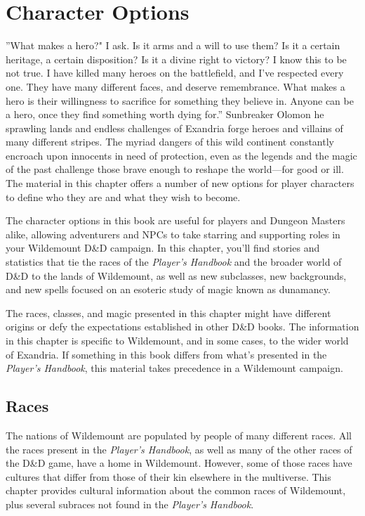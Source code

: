 \documentclass[10pt,a4paper,twoside,bg=print,twocolumn,openany,nodeprecatedcode]{dndbook}
\begin{document}
\chapter{Character Options}
\DndQuote%
{}
{''What makes a hero?" I ask. Is it arms and a will to use them? Is it a certain heritage, a certain disposition? Is it a divine right to victory? I know this to be not true. I have killed many heroes on the battlefield, and I've respected every one. They have many different faces, and deserve remembrance. What makes a hero is their willingness to sacrifice for something they believe in. Anyone can be a hero, once they find something worth dying for.''}
{Sunbreaker Olomon}
he sprawling lands and endless challenges of Exandria forge heroes and villains of many different stripes. The myriad dangers of this wild continent constantly encroach upon innocents in need of protection, even as the legends and the magic of the past challenge those brave enough to reshape the world—for good or ill. The material in this chapter offers a number of new options for player characters to define who they are and what they wish to become.


The character options in this book are useful for players and Dungeon Masters alike, allowing adventurers and NPCs to take starring and supporting roles in your Wildemount D\&D campaign. In this chapter, you'll find stories and statistics that tie the races of the \textit{Player's Handbook} and the broader world of D\&D to the lands of Wildemount, as well as new subclasses, new backgrounds, and new spells focused on an esoteric study of magic known as dunamancy.

The races, classes, and magic presented in this chapter might have different origins or defy the expectations established in other D\&D books. The information in this chapter is specific to Wildemount, and in some cases, to the wider world of Exandria. If something in this book differs from what's presented in the \textit{Player's Handbook}, this material takes precedence in a Wildemount campaign.

\section{Races}
The nations of Wildemount are populated by people of many different races. All the races present in the \textit{Player's Handbook}, as well as many of the other races of the D\&D game, have a home in Wildemount. However, some of those races have cultures that differ from those of their kin elsewhere in the multiverse. This chapter provides cultural information about the common races of Wildemount, plus several subraces not found in the \textit{Player's Handbook}.
\end{document}
